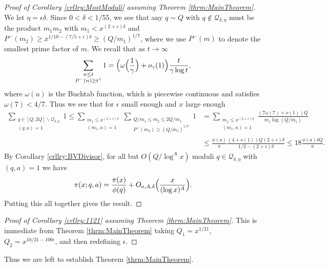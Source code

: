 \documentclass[10pt]{amsart}
\theoremstyle{plain}
\numberwithin{equation}{section}
\begin{document}
%
%
\begin{proof}[Proof of Corollary \ref{crllry:MostModuli} assuming Theorem \ref{thrm:MainTheorem}]
We let $\eta=\epsilon\delta$. Since $0<\delta<1/55$, we see that any $q\sim Q$ with $q\notin \mathcal{Q}_{\delta,\eta}$ must be the product $m_1m_2$ with $m_1<x^{(2+\epsilon)\delta}$ and $P^-(m_2)\ge x^{1/10-(7/5+\epsilon)\delta}\ge (Q/m_1)^{1/7}$, where we use $P^-(m)$ to denote the smallest prime factor of $m$. We recall that as $t\rightarrow\infty$
\[
\sum_{\substack{n\le t\\ P^-(n)\ge t^\gamma}}1=\Bigl(\omega\Bigl(\frac{1}{\gamma}\Bigr)+o_\gamma(1)\Bigr)\frac{t}{\gamma\log{t}} ,
\]
where $\omega(u)$ is the Buchtab function, which is piecewise continuous and satisfies $\omega(7)< 4/7$. Thus we see that for $\epsilon$ small enough and $x$ large enough
\begin{align*}
\sum_{\substack{q\in [Q,2Q]\backslash\mathcal{Q}_{\delta,\eta}\\ (q,a)=1}}1\le \sum_{\substack{m_1\le x^{(2+\epsilon)\delta} \\ (m_1,a)=1}}\sum_{\substack{Q/m_1\le m_2\le 2Q/m_1\\ P^-(m_2)\ge (Q/m_1)^{1/7}}}1&= \sum_{\substack{m_1\le x^{(2+\epsilon)\delta}\\ (m_1,a)=1}}\frac{(7\omega(7)+o(1))Q}{m_1\log(Q/m_1)}\\
&\le \frac{\phi(a)}{a}\frac{(4+o(1))Q(2+\epsilon)\delta}{1/2-(2+\epsilon)\delta}\le 18\frac{\phi(a)\delta Q}{a}.
\end{align*}
By Corollary \ref{crllry:BVDivisor}, for all but $O(Q/\log^A{x})$ moduli $q\in\mathcal{Q}_{\delta,\eta}$ with $(q,a)=1$ we have 
\[
\pi(x;q,a)=\frac{\pi(x)}{\phi(q)}+O_{a,A,\delta}\Bigl(\frac{x}{(\log{x})^{A}}\Bigr).
\] 
Putting this all together gives the result.
\end{proof}
%
%
%
%
%
%
%
%
\begin{proof}[Proof of Corollary \ref{crllry:1121} assuming Theorem \ref{thrm:MainTheorem}]
This is immediate from Theorem \ref{thrm:MainTheorem} taking $Q_1=x^{1/21}$, $Q_2=x^{10/21-100\epsilon}$, and then redefining $\epsilon$.
\end{proof}
%
%
%
%
%
%
%
%
Thus we are left to establish Theorem \ref{thrm:MainTheorem}.
%
%
%
%
%
%
%
%
%
%
%
%
%
%
%
%
%
%
%
%
%
\end{document}
